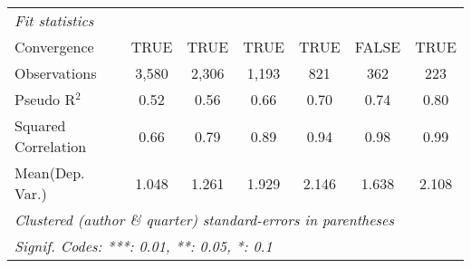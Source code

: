 \begin{tabular}{lcccccc}
   \midrule
   \emph{Fit statistics}\\
   Convergence                                                &TRUE          & TRUE          & TRUE          & TRUE          & FALSE   & TRUE\\  
   Observations                                               & 3,580        & 2,306         & 1,193         & 821           & 362     & 223\\  
   Pseudo R$^2$                                               & 0.52         & 0.56          & 0.66          & 0.70          & 0.74    & 0.80\\  
   Squared Correlation                                        & 0.66         & 0.79          & 0.89          & 0.94          & 0.98    & 0.99\\  
Mean(Dep. Var.) & 1.048 & 1.261 & 1.929 & 2.146 & 1.638 & 2.108 \\
   \midrule \midrule
   \multicolumn{7}{l}{\emph{Clustered (author \& quarter) standard-errors in parentheses}}\\
   \multicolumn{7}{l}{\emph{Signif. Codes: ***: 0.01, **: 0.05, *: 0.1}}\\
\end{tabular}
\par\endgroup
